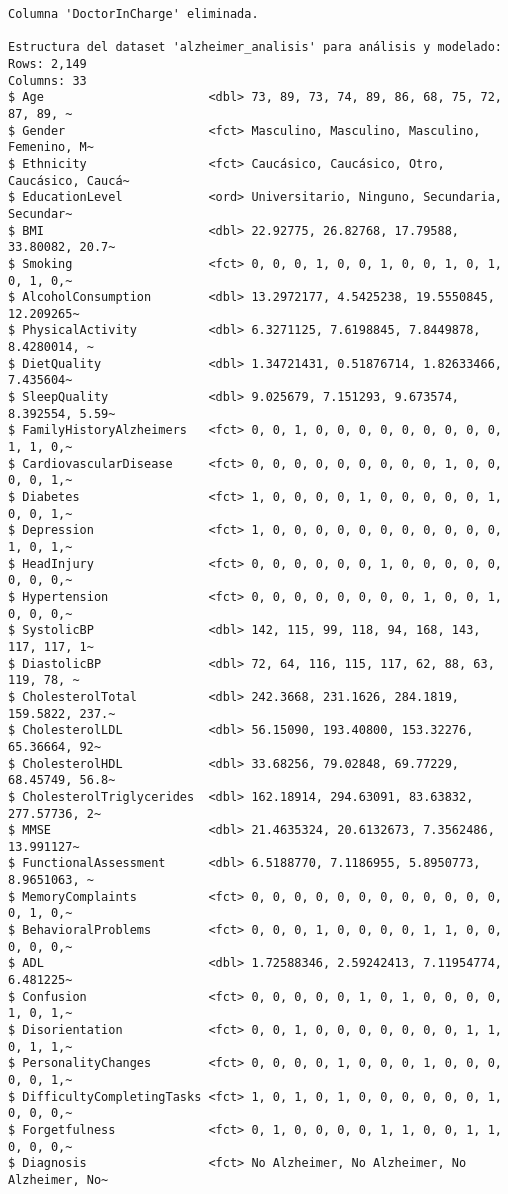 \documentclass[
  letterpaper,
  DIV=11,
  numbers=noendperiod]{scrartcl}
\begin{document}
\begin{verbatim}
Columna 'DoctorInCharge' eliminada.

Estructura del dataset 'alzheimer_analisis' para análisis y modelado:
Rows: 2,149
Columns: 33
$ Age                       <dbl> 73, 89, 73, 74, 89, 86, 68, 75, 72, 87, 89, ~
$ Gender                    <fct> Masculino, Masculino, Masculino, Femenino, M~
$ Ethnicity                 <fct> Caucásico, Caucásico, Otro, Caucásico, Caucá~
$ EducationLevel            <ord> Universitario, Ninguno, Secundaria, Secundar~
$ BMI                       <dbl> 22.92775, 26.82768, 17.79588, 33.80082, 20.7~
$ Smoking                   <fct> 0, 0, 0, 1, 0, 0, 1, 0, 0, 1, 0, 1, 0, 1, 0,~
$ AlcoholConsumption        <dbl> 13.2972177, 4.5425238, 19.5550845, 12.209265~
$ PhysicalActivity          <dbl> 6.3271125, 7.6198845, 7.8449878, 8.4280014, ~
$ DietQuality               <dbl> 1.34721431, 0.51876714, 1.82633466, 7.435604~
$ SleepQuality              <dbl> 9.025679, 7.151293, 9.673574, 8.392554, 5.59~
$ FamilyHistoryAlzheimers   <fct> 0, 0, 1, 0, 0, 0, 0, 0, 0, 0, 0, 0, 1, 1, 0,~
$ CardiovascularDisease     <fct> 0, 0, 0, 0, 0, 0, 0, 0, 0, 1, 0, 0, 0, 0, 1,~
$ Diabetes                  <fct> 1, 0, 0, 0, 0, 1, 0, 0, 0, 0, 0, 1, 0, 0, 1,~
$ Depression                <fct> 1, 0, 0, 0, 0, 0, 0, 0, 0, 0, 0, 0, 1, 0, 1,~
$ HeadInjury                <fct> 0, 0, 0, 0, 0, 0, 1, 0, 0, 0, 0, 0, 0, 0, 0,~
$ Hypertension              <fct> 0, 0, 0, 0, 0, 0, 0, 0, 1, 0, 0, 1, 0, 0, 0,~
$ SystolicBP                <dbl> 142, 115, 99, 118, 94, 168, 143, 117, 117, 1~
$ DiastolicBP               <dbl> 72, 64, 116, 115, 117, 62, 88, 63, 119, 78, ~
$ CholesterolTotal          <dbl> 242.3668, 231.1626, 284.1819, 159.5822, 237.~
$ CholesterolLDL            <dbl> 56.15090, 193.40800, 153.32276, 65.36664, 92~
$ CholesterolHDL            <dbl> 33.68256, 79.02848, 69.77229, 68.45749, 56.8~
$ CholesterolTriglycerides  <dbl> 162.18914, 294.63091, 83.63832, 277.57736, 2~
$ MMSE                      <dbl> 21.4635324, 20.6132673, 7.3562486, 13.991127~
$ FunctionalAssessment      <dbl> 6.5188770, 7.1186955, 5.8950773, 8.9651063, ~
$ MemoryComplaints          <fct> 0, 0, 0, 0, 0, 0, 0, 0, 0, 0, 0, 0, 0, 1, 0,~
$ BehavioralProblems        <fct> 0, 0, 0, 1, 0, 0, 0, 0, 1, 1, 0, 0, 0, 0, 0,~
$ ADL                       <dbl> 1.72588346, 2.59242413, 7.11954774, 6.481225~
$ Confusion                 <fct> 0, 0, 0, 0, 0, 1, 0, 1, 0, 0, 0, 0, 1, 0, 1,~
$ Disorientation            <fct> 0, 0, 1, 0, 0, 0, 0, 0, 0, 0, 1, 1, 0, 1, 1,~
$ PersonalityChanges        <fct> 0, 0, 0, 0, 1, 0, 0, 0, 1, 0, 0, 0, 0, 0, 1,~
$ DifficultyCompletingTasks <fct> 1, 0, 1, 0, 1, 0, 0, 0, 0, 0, 0, 1, 0, 0, 0,~
$ Forgetfulness             <fct> 0, 1, 0, 0, 0, 0, 1, 1, 0, 0, 1, 1, 0, 0, 0,~
$ Diagnosis                 <fct> No Alzheimer, No Alzheimer, No Alzheimer, No~
\end{verbatim}
\end{document}
